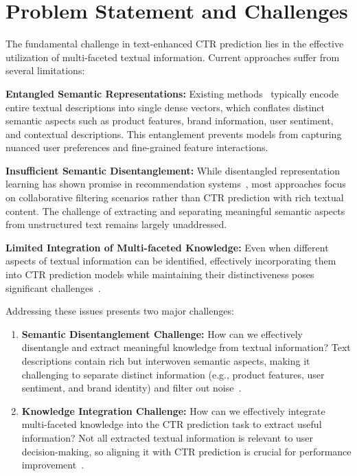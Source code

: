 \section{Problem Statement and Challenges}

The fundamental challenge in text-enhanced CTR prediction lies in the effective utilization of multi-faceted textual information. Current approaches suffer from several limitations:

\textbf{Entangled Semantic Representations:} Existing methods~\cite{li2023ctrl, wang2023bert4ctr} typically encode entire textual descriptions into single dense vectors, which conflates distinct semantic aspects such as product features, brand information, user sentiment, and contextual descriptions. This entanglement prevents models from capturing nuanced user preferences and fine-grained feature interactions.

\textbf{Insufficient Semantic Disentanglement:} While disentangled representation learning has shown promise in recommendation systems~\cite{ma2019learning, wang2021multimodal, cao2022disencdr}, most approaches focus on collaborative filtering scenarios rather than CTR prediction with rich textual content. The challenge of extracting and separating meaningful semantic aspects from unstructured text remains largely unaddressed.

\textbf{Limited Integration of Multi-faceted Knowledge:} Even when different aspects of textual information can be identified, effectively incorporating them into CTR prediction models while maintaining their distinctiveness poses significant challenges~\cite{zhang2024towards}.

Addressing these issues presents two major challenges: 
\begin{enumerate}
    \item \textbf{Semantic Disentanglement Challenge:} How can we effectively disentangle and extract meaningful knowledge from textual information? Text descriptions contain rich but interwoven semantic aspects, making it challenging to separate distinct information (e.g., product features, user sentiment, and brand identity) and filter out noise~\cite{wang2024disentangled, locatello2019challenging}.
    \item \textbf{Knowledge Integration Challenge:} How can we effectively integrate multi-faceted knowledge into the CTR prediction task to extract useful information? Not all extracted textual information is relevant to user decision-making, so aligning it with CTR prediction is crucial for performance improvement~\cite{ni2019justifying, wong2021improving}.
\end{enumerate}

